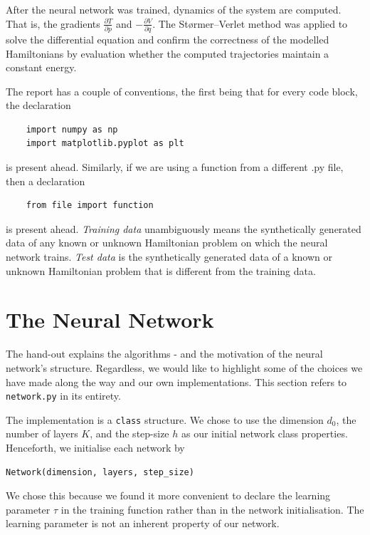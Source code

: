 \documentclass{article}
\begin{document}
After the neural network was trained, dynamics of the system are computed. That is, the gradients $\frac{\partial T}{\partial p}$ and $- \frac{\partial V}{\partial q}$. The Størmer--Verlet method was applied to solve the differential equation and confirm the correctness of the modelled Hamiltonians by evaluation whether the computed trajectories maintain a constant energy.

The report has a couple of conventions, the first being that for every code block, the declaration
\begin{lstlisting}
    import numpy as np
    import matplotlib.pyplot as plt
\end{lstlisting}
is present ahead. Similarly, if we are using a function from a different .py file, then a declaration
\begin{lstlisting}
    from file import function
\end{lstlisting}
is present ahead. \textit{Training data} unambiguously means the synthetically generated data of any known or unknown Hamiltonian problem on which the neural network trains. \textit{Test data} is the synthetically generated data of a known or unknown Hamiltonian problem that is different from the training data.
\newpage
\section{The Neural Network}
The hand-out explains the algorithms - and the motivation of the neural network's structure. Regardless, we would like to highlight some of the choices we have made along the way and our own implementations. This section refers to \verb|network.py| in its entirety.

The implementation is a \verb|class| structure. We chose to use the dimension $d_0$, the number of layers $K$, and the step-size $h$ as our initial network class properties. Henceforth, we initialise each network by
\begin{verbatim}
Network(dimension, layers, step_size)
\end{verbatim} 
We chose this because we found it more convenient to declare the learning parameter $\tau$ in the training function rather than in the network initialisation. The learning parameter is not an inherent property of our network.
\end{document}
